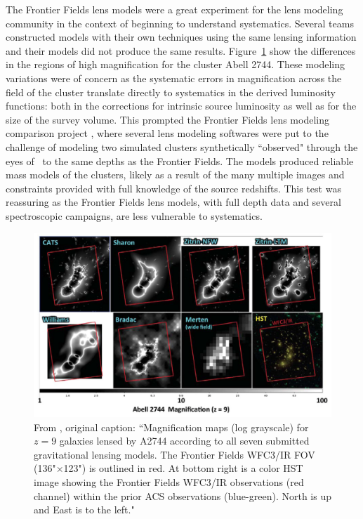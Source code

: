 The Frontier Fields lens models were a great experiment for the lens modeling community in the context of beginning to understand systematics. Several teams constructed models with their own techniques using the same lensing information and their models did not produce the same results. Figure~\ref{intro:fig:hff_models} show the differences in the regions of high magnification for the cluster Abell 2744. These modeling variations were of concern as the systematic errors in magnification across the field of the cluster translate directly to systematics in the derived luminosity functions: both in the corrections for intrinsic source luminosity as well as for the size of the survey volume. This prompted the Frontier Fields lens modeling comparison project \citep{Meneghetti:2016xe}, where several lens modeling softwares were put to the challenge of modeling two simulated clusters synthetically ``observed" through the eyes of \hst\ to the same depths as the Frontier Fields. The models produced reliable mass models of the clusters, likely as a result of the many multiple images and constraints provided with full knowledge of the source redshifts. This test was reassuring as the Frontier Fields lens models, with full depth data and several spectroscopic campaigns, are less vulnerable to systematics.

\begin{figure}
\includegraphics[width=\textwidth]{Intro/hff_models.png}
\caption[Magnification maps of Abell~2744 produced by Frontier Fields lens modeling teams]{From \citet{Coe:2015qf}, original caption: ``Magnification maps (log grayscale) for $z=9$ galaxies lensed by A2744 according to all seven submitted gravitational lensing models. The Frontier Fields WFC3/IR FOV (136"$\times$123") is outlined in red. At bottom right is a color HST image \citep[produced with Trilogy; ][]{Coe:2012px} showing the Frontier Fields WFC3/IR observations (red channel) within the prior ACS observations (blue-green). North is up and East is to the left."}
\label{intro:fig:hff_models}
\end{figure}

